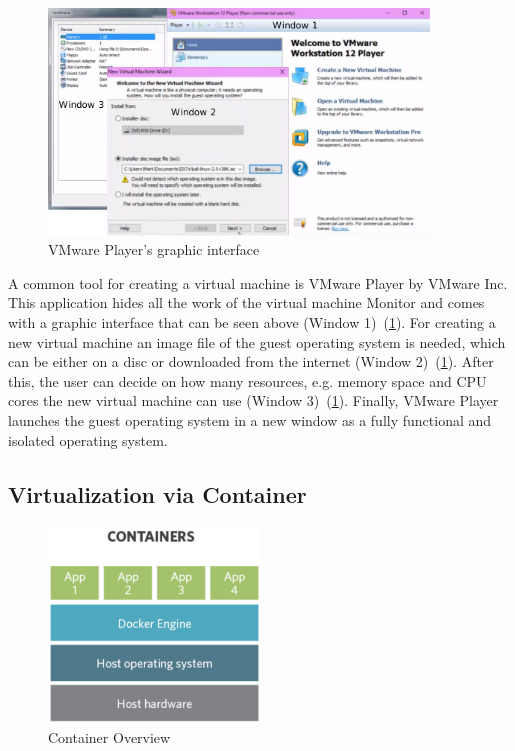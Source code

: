 \documentclass[utf8,biblatex, ngerman, english]{lni}
\begin{document}
\begin{figure}
  \centering
  \includegraphics[width=0.9\textwidth]{VMware Player.pdf}
  \caption{VMware Player's graphic interface}
  \label{img:VMwarePlayer}
\end{figure}

A common tool for creating a virtual machine is VMware Player by VMware Inc. This application hides all the work of the virtual machine Monitor and comes with a graphic interface that can be seen above (Window 1)\ (\ref{img:VMwarePlayer}). For creating a new virtual machine an image file of the guest operating system is needed, which can be either on a disc or downloaded from the internet (Window 2)\ (\ref{img:VMwarePlayer}). After this, the user can decide on how many resources, e.g. memory space and CPU cores the new virtual machine can use (Window 3)\ (\ref{img:VMwarePlayer}). Finally, VMware Player launches the guest operating system in a new window as a fully functional and isolated operating system.

\subsection{Virtualization via Container}

\begin{figure}
  \centering
  \includegraphics[width=0.5\textwidth]{Container.pdf}
  \caption{Container Overview}
  \label{img:container}
\end{figure}
\end{document}
